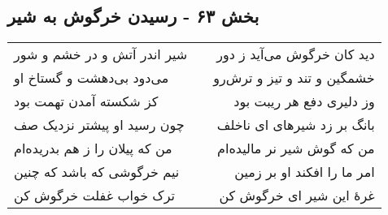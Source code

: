 \begin{center}
\section*{بخش ۶۳ - رسیدن خرگوش به شیر}
\label{sec:sh063}
\begin{longtable}{l p{0.5cm} r}
شیر اندر آتش و در خشم و شور
&&
دید کان خرگوش می‌آید ز دور
\\
می‌دود بی‌دهشت و گستاخ او
&&
خشمگین و تند و تیز و ترش‌رو
\\
کز شکسته آمدن تهمت بود
&&
وز دلیری دفع هر ریبت بود
\\
چون رسید او پیشتر نزدیک صف
&&
بانگ بر زد شیرهای ای ناخلف
\\
من که پیلان را ز هم بدریده‌ام
&&
من که گوش شیر نر مالیده‌ام
\\
نیم خرگوشی که باشد که چنین
&&
امر ما را افکند او بر زمین
\\
ترک خواب غفلت خرگوش کن
&&
غرهٔ این شیر ای خرگوش کن
\\
\end{longtable}
\end{center}
